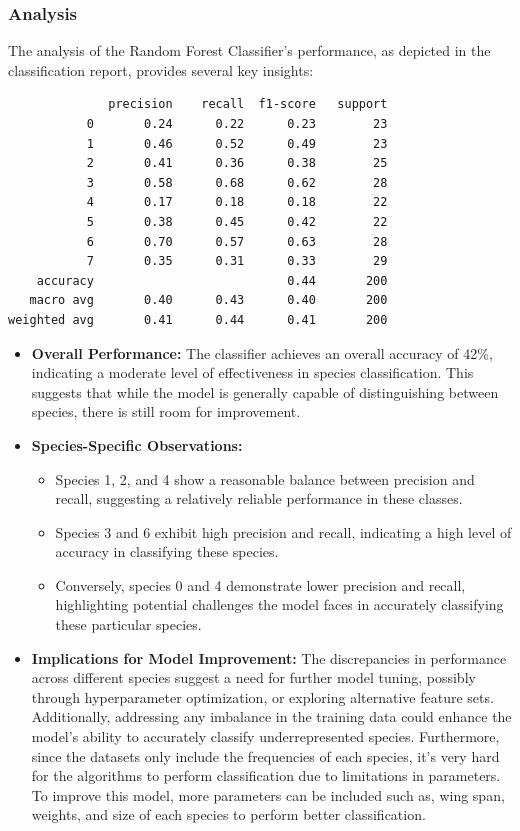 \documentclass[12pt]{article}
\begin{document}
\subsubsection{Analysis}
The analysis of the Random Forest Classifier's performance, as depicted in the classification report, provides several key insights:
\begin{center}
\begin{verbatim}
              precision    recall  f1-score   support
           0       0.24      0.22      0.23        23
           1       0.46      0.52      0.49        23
           2       0.41      0.36      0.38        25
           3       0.58      0.68      0.62        28
           4       0.17      0.18      0.18        22
           5       0.38      0.45      0.42        22
           6       0.70      0.57      0.63        28
           7       0.35      0.31      0.33        29
    accuracy                           0.44       200
   macro avg       0.40      0.43      0.40       200
weighted avg       0.41      0.44      0.41       200
\end{verbatim}
\end{center}

\begin{itemize}
    \item \textbf{Overall Performance:} The classifier achieves an overall accuracy of 42\%, indicating a moderate level of effectiveness in species classification. This suggests that while the model is generally capable of distinguishing between species, there is still room for improvement.

    \item \textbf{Species-Specific Observations:}
    \begin{itemize}
        \item Species 1, 2, and 4 show a reasonable balance between precision and recall, suggesting a relatively reliable performance in these classes.
        \item Species 3 and 6 exhibit high precision and recall, indicating a high level of accuracy in classifying these species.
        \item Conversely, species 0 and 4 demonstrate lower precision and recall, highlighting potential challenges the model faces in accurately classifying these particular species.
    \end{itemize}
    \item \textbf{Implications for Model Improvement:} The discrepancies in performance across different species suggest a need for further model tuning, possibly through hyperparameter optimization, or exploring alternative feature sets. Additionally, addressing any imbalance in the training data could enhance the model's ability to accurately classify underrepresented species. Furthermore, since the datasets only include the frequencies of each species, it's very hard for the algorithms to perform classification due to limitations in parameters. To improve this model, more parameters can be included such as, wing span, weights, and size of each species to perform better classification.
\end{itemize}
\end{document}
